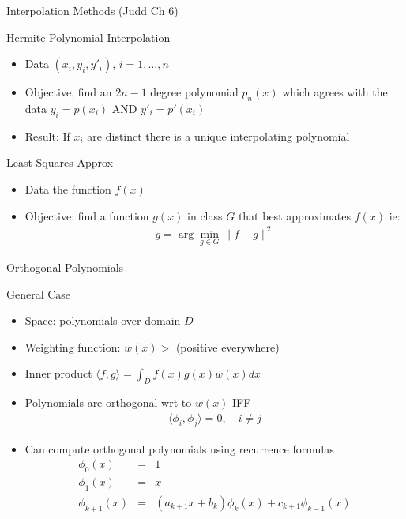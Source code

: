 \documentclass[xcolor=pdftex,dvipsnames,table,mathserif,aspectratio=169]{beamer}
\begin{document}
\begin{frame}{Interpolation Methods  (Judd Ch 6)}
\begin{block}{Hermite Polynomial Interpolation}
\begin{itemize}
\item Data $(x_i,y_i,y'_i)$, $i=1,\ldots,n$
\item Objective, find an $2n-1$ degree polynomial $p_n(x)$ which agrees with the data $y_i = p(x_i)$ AND $y'_i = p'(x_i)$
\item Result: If $x_i$ are distinct there is a unique interpolating polynomial
\end{itemize}
\end{block}
\begin{block}{Least Squares Approx}
\begin{itemize}
\item Data the function $f(x)$
\item Objective: find a function $g(x)$ in class $G$ that best approximates $f(x)$ ie:
\begin{eqnarray*}
g = \arg \min_{g \in G} \| f-g\|^2
\end{eqnarray*}
\end{itemize}
\end{block}
\end{frame}

\begin{frame}{Orthogonal Polynomials}
\begin{block}{General Case}
\begin{itemize}
\item Space: polynomials over domain $D$
\item Weighting function: $w(x) > $ (positive everywhere)
\item Inner product $\langle f,g \rangle = \int_D f(x) g(x) w(x) d x$
\item Polynomials are orthogonal wrt to $w(x)$ IFF 
\begin{eqnarray*}
\langle \phi_i, \phi_j \rangle = 0, \quad i \neq j
\end{eqnarray*}
\item Can compute orthogonal polynomials using recurrence formulas
\begin{eqnarray*}
\phi_0(x) &=& 1\\
\phi_1(x) &=& x \\
\phi_{k+1}(x) &=& (a_{k+1} x + b_k) \phi_k(x) + c_{k+1} \phi_{k-1}(x)
\end{eqnarray*}
\end{itemize}
\end{block}
\end{frame}
\end{document}
